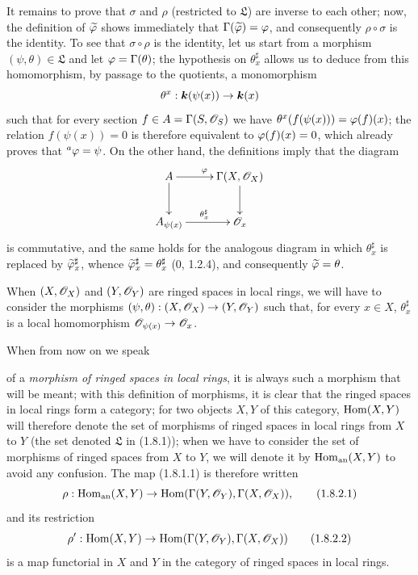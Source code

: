 It remains to prove that $\sigma$ and $\rho$ (restricted to $\mathfrak L$)
are inverse to each other; now, the definition of
$\widetilde{\varphi}$ shows immediately that
$\Gamma(\widetilde{\varphi})=\varphi$, and consequently $\rho\circ\sigma$ is
the identity. To see that $\sigma\circ\rho$ is the identity, let us start
from a morphism $(\psi,\theta)\in\mathfrak L$ and let
$\varphi=\Gamma(\theta)$; the hypothesis on $\theta_x^\sharp$ allows us to
deduce from this homomorphism, by passage to the quotients, a
monomorphism
\[
  \theta^x:\boldsymbol{k}(\psi(x))\to\boldsymbol{k}(x)
\]
such that for every section $f\in A=\Gamma(S,\mathscr{O}_S)$ we have
$\theta^x(f(\psi(x)))=\varphi(f)(x)$; the relation $f(\psi(x))=0$ is therefore
equivalent to $\varphi(f)(x)=0$, which already proves that
${}^a\varphi=\psi$. On the other hand, the definitions imply that the
diagram
\[
  \xymatrix{
    A\ar[r]^\vphi\ar[d] &
    \Gamma(X,\sh{O}_X)\ar[d]\\
    A_{\psi(x)}\ar[r]^{\theta_x^\sharp} &
    \sh{O}_x
  }
\]
is commutative, and the same holds for the analogous diagram in which
$\theta_x^\sharp$ is replaced by
$\widetilde{\varphi}_x^\sharp$, whence
$\widetilde{\varphi}_x^\sharp=\theta_x^\sharp$ (0, 1.2.4), and consequently
$\widetilde{\varphi}=\theta$.

\begin{env}[1.8.2]
\label{ega2:addendum:I.1.8.2}
When $(X,\mathscr{O}_X)$ and $(Y,\mathscr{O}_Y)$ are ringed spaces in
local rings, we will have to consider the morphisms
$(\psi,\theta):(X,\mathscr{O}_X)\to(Y,\mathscr{O}_Y)$ such that, for every
$x\in X$, $\theta_x^\sharp$ is a local homomorphism
$\mathscr{O}_{\psi(x)}\to\mathscr{O}_x$.

When from now on we speak
of a \emph{morphism of ringed spaces
in local rings}, it is always such a morphism that will be meant;
with this definition of morphisms, it is clear that the ringed spaces
in local rings form a category; for two objects
$X,Y$ of this category, $\operatorname{Hom}(X,Y)$ will therefore denote the set of
morphisms of ringed spaces in local rings from $X$ to $Y$
(the set denoted $\mathfrak L$ in (1.8.1)); when we have to
consider the set of morphisms of ringed spaces from $X$ to
$Y$, we will denote it by $\operatorname{Hom}_{\mathrm{an}}(X,Y)$ to avoid any
confusion. The map (1.8.1.1) is therefore written
\begin{equation}
\label{ega2:addendum:I.1.8.2.1}
  \rho:\operatorname{Hom}_{\mathrm{an}}(X,Y)
  \to\operatorname{Hom}(\Gamma(Y,\mathscr{O}_Y),\Gamma(X,\mathscr{O}_X)),
\tag{1.8.2.1}
\end{equation}
and its restriction
\begin{equation}
\label{ega2:addendum:I.1.8.2.2}
  \rho':\operatorname{Hom}(X,Y)
  \to\operatorname{Hom}(\Gamma(Y,\mathscr{O}_Y),\Gamma(X,\mathscr{O}_X))
\tag{1.8.2.2}
\end{equation}
is a map functorial in $X$ and $Y$ in the category of ringed
spaces in local rings.
\end{env}

